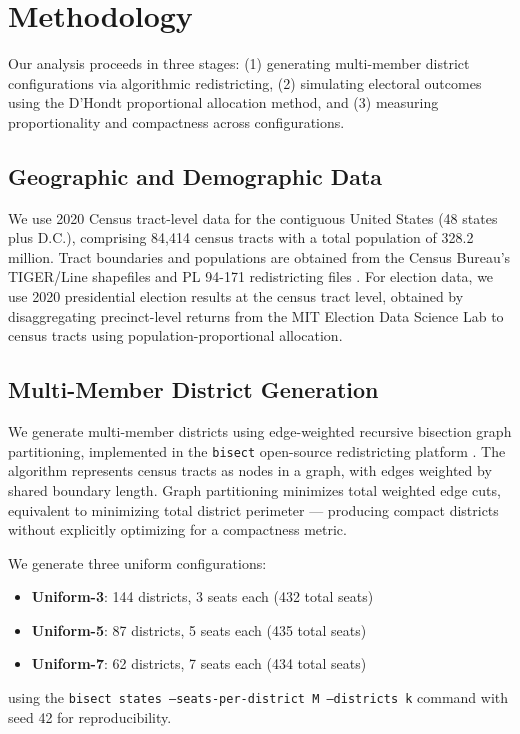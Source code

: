 
\section{Methodology}

Our analysis proceeds in three stages: (1) generating multi-member district configurations via algorithmic redistricting, (2) simulating electoral outcomes using the D'Hondt proportional allocation method, and (3) measuring proportionality and compactness across configurations.

\subsection{Geographic and Demographic Data}

We use 2020 Census tract-level data for the contiguous United States (48 states plus D.C.), comprising 84,414 census tracts with a total population of 328.2 million. Tract boundaries and populations are obtained from the Census Bureau's TIGER/Line shapefiles and PL 94-171 redistricting files \citep{census2020pl941}. For election data, we use 2020 presidential election results at the census tract level, obtained by disaggregating precinct-level returns from the MIT Election Data Science Lab \citep{MEDSL2020} to census tracts using population-proportional allocation.

\subsection{Multi-Member District Generation}

We generate multi-member districts using edge-weighted recursive bisection graph partitioning, implemented in the \texttt{bisect} open-source redistricting platform \citep{redistcli2026}. The algorithm represents census tracts as nodes in a graph, with edges weighted by shared boundary length. Graph partitioning minimizes total weighted edge cuts, equivalent to minimizing total district perimeter --- producing compact districts without explicitly optimizing for a compactness metric.

We generate three uniform configurations:
\begin{itemize}
    \item \textbf{Uniform-3}: 144 districts, 3 seats each (432 total seats)
    \item \textbf{Uniform-5}: 87 districts, 5 seats each (435 total seats)
    \item \textbf{Uniform-7}: 62 districts, 7 seats each (434 total seats)
\end{itemize}
using the \texttt{bisect states --seats-per-district M --districts k} command with seed 42 for reproducibility.

